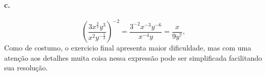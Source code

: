 	\paragraph{c.}
	\begin{equation}
	\left(\frac{3x^{\frac{3}{2}}y^3}{x^2y^{-\frac{1}{2}}}\right)^{-2} = \frac{3^{-2}x^{-3}y^{-6}}{x^{-4}y} = \frac{x}{9y^7},
	\end{equation}
	Como de costumo, o exercicio final apresenta maior dificuldade, mas com uma atenção aos detalhes muita coisa nessa expressão pode ser simplificada facilitando sua resolução.




\subsection{}







